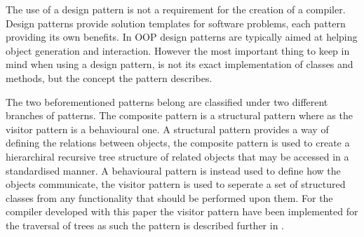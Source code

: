 The use of a design pattern is not a requirement for the creation of a compiler.
Design patterns provide solution templates for software problems, each pattern providing its own benefits.
In OOP design patterns are typically aimed at helping object generation and interaction.
However the most important thing to keep in mind when using a design pattern, is not its exact implementation of classes and methods, but the concept the pattern describes.

The two beforementioned patterns belong are classified under two different branches of patterns.
The composite pattern is a structural pattern where as the visitor pattern is a behavioural one.
A structural pattern provides a way of defining the relations between objects, the composite pattern is used to create a hierarchiral recursive tree structure of related objects that may be accessed in a standardised manner.
A behavioural pattern is instead used to define how the objects communicate, the visitor pattern is used to seperate a set of structured classes from any functionality that should be performed upon them.
For the compiler developed with this paper the visitor pattern have been implemented for the traversal of trees as such the pattern is described further in .  